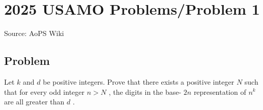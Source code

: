 \documentclass[12pt]{article}
\begin{document}
\section*{{2025 USAMO Problems/Problem 1}}
Source: AoPS Wiki

\subsection*{Problem}
Let $k$ and $d$ be positive integers. Prove that there exists a positive integer $N$ such that for every odd integer $n>N$ , the digits in the base- $2n$ representation of $n^k$ are all greater than $d$ .
\end{document}
